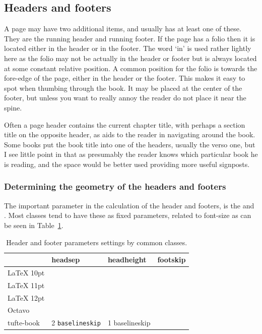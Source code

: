 \subsection{Headers and footers}
A page may have two additional items, and usually has at least one of these. They are the
running header and running footer. If the page has a folio then it is located either in the
header or in the footer. The word ‘in’ is used rather lightly here as the folio may not be
actually in the header or footer but is always located at some constant relative position. A
common position for the folio is towards the fore-edge of the page, either in the header or
the footer. This makes it easy to spot when thumbing through the book. It may be placed
at the center of the footer, but unless you want to really annoy the reader do not place it
near the spine.

Often a page header contains the current chapter title, with perhaps a section title on
the opposite header, as aids to the reader in navigating around the book. Some books put
the book title into one of the headers, usually the verso one, but I see little point in that as
presumably the reader knows which particular book he is reading, and the space would
be better used providing more useful signposts.

\subsubsection{Determining the geometry of the headers and footers}

The important parameter in the calculation of the header and footers, is the  and . Most classes tend to have these as fixed parameters, related to font-size as can be seen in Table~\ref{tab:headerparams}.

\begin{table}[htbp]
\centering
\caption{Header and footer parameters settings by common classes.}
\label{tab:headerparams}
\begin{tabular}{llll}
\toprule
                    &headsep                   &headheight &footskip\\
\midrule
LaTeX 10pt    &             &                 &           \\
LaTeX 11pt    &             &                 &           \\
LaTeX 12pt    &             &                 &           \\
Octavo          &             &                 &           \\
tufte-book     &2 \texttt{baselineskip}   & 1 baselineskip           &            \\
\bottomrule
\end{tabular}
\end{table}


